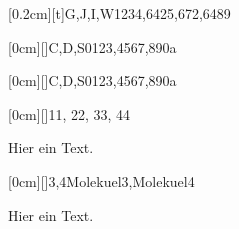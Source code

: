 \documentclass[./main.tex]{subfiles}
\begin{document}


\kastenarray[2.5cm]{3cm}[0.2cm][t]{G,J,I,W}{1234,6425,672,6489}

\kastenarray[3cm]{4cm}[0cm][]{C,D,S}{0123,4567,890a}

\kastenarray{2cm}[0cm][]{C,D,S}{0123,4567,890a}

\kastenarraycustom{2cm}[0cm][]{11, 22, 33, 44}

Hier ein Text.


\kastenarray[7cm]{7cm}[0cm][]{3,4}{Molekuel3,Molekuel4}

Hier ein Text. \newpage \aufgabenende
\end{document}
